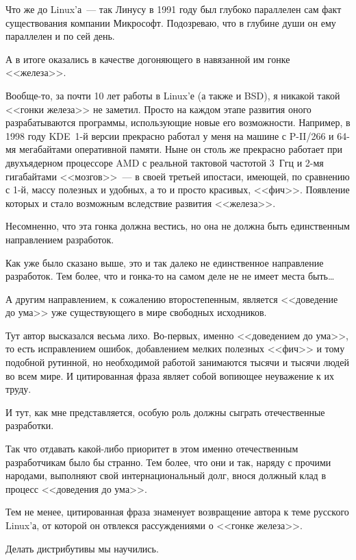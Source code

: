 Что же до Linux'а~--- так Линусу в 1991 году был глубоко параллелен сам факт существования компании Микрософт. Подозреваю, что в глубине души он ему параллелен и по сей день. 
\begin{shadequote}{}
А в итоге оказались в качестве догоняющего в навязанной им гонке <<железа>>.
\end{shadequote}
Вообще-то, за почти 10 лет работы в Linux'е (а также и BSD), я никакой такой <<гонки железа>> не заметил. Просто на каждом этапе развития оного разрабатываются программы, использующие новые его возможности. Например, в 1998 году KDE~1-й версии прекрасно работал у меня на машине с P-II/266 и 64-мя мегабайтами оперативной памяти. Ныне он столь же прекрасно работает при двухъядерном процессоре AMD с реальной тактовой частотой 3~Ггц и 2-мя гигабайтами <<мозгов>>~--- в своей третьей ипостаси, имеющей, по сравнению с 1-й, массу полезных и удобных, а то и просто красивых, <<фич>>. Появление которых и стало возможным вследствие развития <<железа>>. 
\begin{shadequote}{}
Несомненно, что эта гонка должна вестись, но она не должна быть единственным направлением разработок.
\end{shadequote}
Как уже было сказано выше, это и так далеко не единственное направление разработок. Тем более, что и гонка-то на самом деле не не имеет места быть\dots 
\begin{shadequote}{}
А другим направлением, к сожалению второстепенным, является <<доведение до ума>> уже существующего в мире свободных исходников.
\end{shadequote}
Тут автор высказался весьма лихо. Во-первых, именно <<доведением до ума>>, то есть исправлением ошибок, добавлением мелких полезных <<фич>> и тому подобной рутинной, но необходимой работой занимаются тысячи и тысячи людей во всем мире. И цитированная фраза являет собой вопиющее неуважение к их труду. 
\begin{shadequote}{}
И тут, как мне представляется, особую роль должны сыграть отечественные разработки.
\end{shadequote}
Так что отдавать какой-либо приоритет в этом именно отечественным разработчикам было бы странно. Тем более, что они и так, наряду с прочими народами, выполняют свой интернациональный долг, внося должный клад в процесс <<доведения до ума>>. 

Тем не менее, цитированная фраза знаменует возвращение автора к теме русского Linux'а, от которой он отвлекся рассуждениями о <<гонке железа>>. 
\begin{shadequote}{}
Делать дистрибутивы мы научились.
\end{shadequote}

